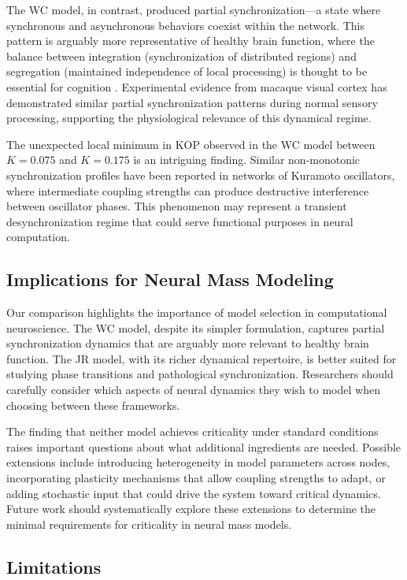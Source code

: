 \documentclass[12pt]{article}
\begin{document}
The WC model, in contrast, produced partial synchronization---a state where synchronous and asynchronous behaviors coexist within the network. This pattern is arguably more representative of healthy brain function, where the balance between integration (synchronization of distributed regions) and segregation (maintained independence of local processing) is thought to be essential for cognition \citep{pikovsky2001synchronization}. Experimental evidence from macaque visual cortex has demonstrated similar partial synchronization patterns during normal sensory processing, supporting the physiological relevance of this dynamical regime.

The unexpected local minimum in KOP observed in the WC model between $K = 0.075$ and $K = 0.175$ is an intriguing finding. Similar non-monotonic synchronization profiles have been reported in networks of Kuramoto oscillators, where intermediate coupling strengths can produce destructive interference between oscillator phases. This phenomenon may represent a transient desynchronization regime that could serve functional purposes in neural computation.

\subsection{Implications for Neural Mass Modeling}

Our comparison highlights the importance of model selection in computational neuroscience. The WC model, despite its simpler formulation, captures partial synchronization dynamics that are arguably more relevant to healthy brain function. The JR model, with its richer dynamical repertoire, is better suited for studying phase transitions and pathological synchronization. Researchers should carefully consider which aspects of neural dynamics they wish to model when choosing between these frameworks.

The finding that neither model achieves criticality under standard conditions raises important questions about what additional ingredients are needed. Possible extensions include introducing heterogeneity in model parameters across nodes, incorporating plasticity mechanisms that allow coupling strengths to adapt, or adding stochastic input that could drive the system toward critical dynamics. Future work should systematically explore these extensions to determine the minimal requirements for criticality in neural mass models.

\subsection{Limitations}
\end{document}
